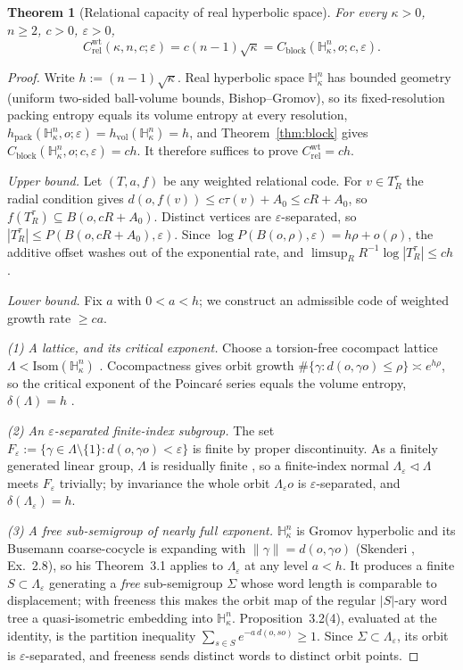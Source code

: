 \documentclass[11pt,reqno]{amsart}
\theoremstyle{plain}
\newtheorem{theorem}{Theorem}[section]
\theoremstyle{definition}
\newcommand{\hpack}{h_{\mathrm{pack}}}
\newcommand{\hvol}{h_{\mathrm{vol}}}
\newcommand{\Crel}{C_{\mathrm{rel}}}
\newcommand{\Cblock}{C_{\mathrm{block}}}
\newcommand{\Hk}{\mathbb{H}^n_\kappa}
\newcommand{\eps}{\varepsilon}
\begin{document}
\begin{theorem}[Relational capacity of real hyperbolic space]\label{thm:relational}
For every $\kappa>0$, $n\ge2$, $c>0$, $\eps>0$,
\[
\Crel^{\mathrm{wt}}(\kappa,n,c;\eps)=c(n-1)\sqrt\kappa=\Cblock(\Hk,o;c,\eps).
\]
\end{theorem}

\begin{proof}
Write $h:=(n-1)\sqrt\kappa$. Real hyperbolic space $\Hk$ has bounded geometry (uniform two-sided ball-volume bounds, Bishop--Gromov), so its fixed-resolution packing entropy equals its volume entropy at every resolution, $\hpack(\Hk,o;\eps)=\hvol(\Hk)=h$, and Theorem~\ref{thm:block} gives $\Cblock(\Hk,o;c,\eps)=ch$. It therefore suffices to prove $\Crel^{\mathrm{wt}}=ch$.

\smallskip
\noindent\emph{Upper bound.} Let $(T,a,f)$ be any weighted relational code. For $v\in T_R^\tau$ the radial condition gives $d(o,f(v))\le c\tau(v)+A_0\le cR+A_0$, so $f(T_R^\tau)\subseteq B(o,cR+A_0)$. Distinct vertices are $\eps$-separated, so $|T_R^\tau|\le P(B(o,cR+A_0),\eps)$. Since $\log P(B(o,\rho),\eps)=h\rho+o(\rho)$, the additive offset washes out of the exponential rate, and $\limsup_R R^{-1}\log|T_R^\tau|\le ch$.

\smallskip
\noindent\emph{Lower bound.} Fix $a$ with $0<a<h$; we construct an admissible code of weighted growth rate $\ge ca$.

\emph{(1) A lattice, and its critical exponent.} Choose a torsion-free cocompact lattice $\Lambda<\mathrm{Isom}(\Hk)$ \cite{borel1963}. Cocompactness gives orbit growth $\#\{\gamma:d(o,\gamma o)\le\rho\}\asymp e^{h\rho}$, so the critical exponent of the Poincar\'e series equals the volume entropy, $\delta(\Lambda)=h$ \cite{patterson1976,sullivan1979}.

\emph{(2) An $\eps$-separated finite-index subgroup.} The set $F_\eps:=\{\gamma\in\Lambda\setminus\{1\}:d(o,\gamma o)<\eps\}$ is finite by proper discontinuity. As a finitely generated linear group, $\Lambda$ is residually finite \cite{malcev1940}, so a finite-index normal $\Lambda_\eps\triangleleft\Lambda$ meets $F_\eps$ trivially; by invariance the whole orbit $\Lambda_\eps o$ is $\eps$-separated, and $\delta(\Lambda_\eps)=h$.

\emph{(3) A free sub-semigroup of nearly full exponent.} $\Hk$ is Gromov hyperbolic and its Busemann coarse-cocycle is expanding with $\|\gamma\|=d(o,\gamma o)$ (Skenderi \cite{skenderi2026}, Ex.~2.8), so his Theorem~3.1 applies to $\Lambda_\eps$ at any level $a<h$. It produces a finite $S\subset\Lambda_\eps$ generating a \emph{free} sub-semigroup $\Sigma$ whose word length is comparable to displacement; with freeness this makes the orbit map of the regular $|S|$-ary word tree a quasi-isometric embedding into $\Hk$. Proposition~3.2(4), evaluated at the identity, is the partition inequality $\sum_{s\in S}e^{-a\,d(o,so)}\ge1$. Since $\Sigma\subset\Lambda_\eps$, its orbit is $\eps$-separated, and freeness sends distinct words to distinct orbit points.


\end{proof}
\end{document}
